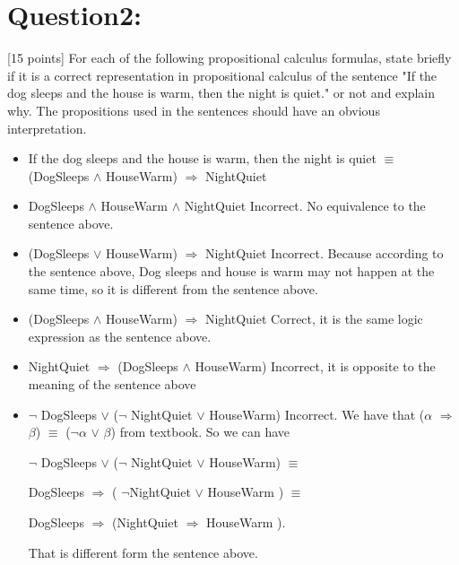 \documentclass{article}
\begin{document}
\section{Question2:}
[15 points] For each of the following propositional calculus formulas, state briefly if it is a correct representation in propositional calculus of the sentence "If the dog sleeps and the house is warm, then the night is quiet." or not and explain why. The propositions used in the sentences should have an obvious interpretation.
\begin{itemize}
    \item If the dog sleeps and the house is warm, then the night is quiet $\equiv$ (DogSleeps $\wedge$ HouseWarm) $\Rightarrow$ NightQuiet
    \item DogSleeps $\wedge$ HouseWarm $\wedge$ NightQuiet\newline
    Incorrect. No equivalence to the sentence above.
    \item (DogSleeps $\vee$ HouseWarm) $\Rightarrow$ NightQuiet\newline
    Incorrect. Because according to the sentence above, Dog sleeps and house is warm may not happen at the same time, so it is different from the sentence above.
    \item (DogSleeps $\wedge$ HouseWarm) $\Rightarrow$ NightQuiet\newline
    Correct, it is the same logic expression as the sentence above. 
    \item NightQuiet $\Rightarrow$ (DogSleeps $\wedge$ HouseWarm)\newline
    Incorrect, it is opposite to the meaning of the sentence above
    \item $\neg$ DogSleeps $\vee$ ($\neg$ NightQuiet $\vee$ HouseWarm)\newline
    Incorrect. We have that ($\alpha$ $\Rightarrow$ $\beta$) $\equiv$ ($\neg$$\alpha$ $\vee$ $\beta$) from textbook.
    So we can have 
    
    $\neg$ DogSleeps $\vee$ ($\neg$ NightQuiet $\vee$ HouseWarm) $\equiv$ 
    
    DogSleeps $\Rightarrow$ ( $\neg$NightQuiet $\vee$ HouseWarm ) $\equiv$ 
    
    DogSleeps $\Rightarrow$ (NightQuiet $\Rightarrow$ HouseWarm ).

    That is different form the sentence above.
    
\end{itemize}
\end{document}
